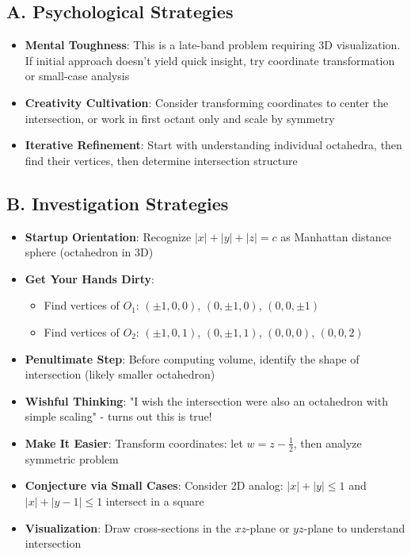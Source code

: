 \documentclass[11pt]{article}
\begin{document}
\begin{strategicbox}
\subsection*{A. Psychological Strategies}
\begin{itemize}[leftmargin=*]
    \item \textbf{Mental Toughness}: This is a late-band problem requiring 3D visualization. If initial approach doesn't yield quick insight, try coordinate transformation or small-case analysis
    \item \textbf{Creativity Cultivation}: Consider transforming coordinates to center the intersection, or work in first octant only and scale by symmetry
    \item \textbf{Iterative Refinement}: Start with understanding individual octahedra, then find their vertices, then determine intersection structure
\end{itemize}

\subsection*{B. Investigation Strategies}
\begin{itemize}[leftmargin=*]
    \item \textbf{Startup Orientation}: Recognize $|x|+|y|+|z|=c$ as Manhattan distance sphere (octahedron in 3D)
    \item \textbf{Get Your Hands Dirty}: 
    \begin{itemize}
        \item Find vertices of $O_1$: $(\pm1,0,0)$, $(0,\pm1,0)$, $(0,0,\pm1)$
        \item Find vertices of $O_2$: $(\pm1,0,1)$, $(0,\pm1,1)$, $(0,0,0)$, $(0,0,2)$
    \end{itemize}
    \item \textbf{Penultimate Step}: Before computing volume, identify the shape of intersection (likely smaller octahedron)
    \item \textbf{Wishful Thinking}: "I wish the intersection were also an octahedron with simple scaling" - turns out this is true!
    \item \textbf{Make It Easier}: Transform coordinates: let $w = z - \frac{1}{2}$, then analyze symmetric problem
    \item \textbf{Conjecture via Small Cases}: Consider 2D analog: $|x|+|y|\le1$ and $|x|+|y-1|\le1$ intersect in a square
    \item \textbf{Visualization}: Draw cross-sections in the $xz$-plane or $yz$-plane to understand intersection
\end{itemize}


\end{strategicbox}
\end{document}
